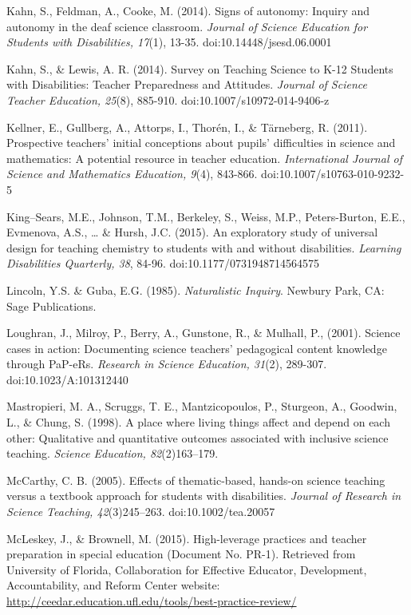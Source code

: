 \documentclass[11.5pt]{sig-alternate} %
\begin{document}
Kahn, S., Feldman, A., Cooke, M. (2014). Signs of autonomy: Inquiry and autonomy in the deaf science classroom. \textit{Journal of Science Education for Students with Disabilities, 17}(1), 13-35. doi:10.14448/jsesd.06.0001

Kahn, S., \& Lewis, A. R. (2014). Survey on Teaching Science to K-12 Students with Disabilities: Teacher Preparedness and Attitudes. \textit{Journal of Science Teacher Education, 25}(8), 885-910. doi:10.1007/s10972-014-9406-z

Kellner, E., Gullberg, A., Attorps, I., Thorén, I., \& Tärneberg, R. (2011). Prospective teachers' initial conceptions about pupils' difficulties in science and mathematics: A potential resource in teacher education. \textit{International Journal of Science and Mathematics Education, 9}(4), 843-866. doi:10.1007/s10763-010-9232-5

King–Sears, M.E., Johnson, T.M., Berkeley, S., Weiss, M.P., Peters-Burton, E.E., Evmenova, A.S., … \& Hursh, J.C. (2015). An exploratory study of universal design for teaching chemistry to students with and without disabilities. \textit{Learning Disabilities Quarterly, 38}, 84-96. doi:10.1177/0731948714564575

Lincoln, Y.S. \& Guba, E.G. (1985). \textit{Naturalistic Inquiry}. Newbury Park, CA: Sage Publications.

Loughran, J., Milroy, P., Berry, A., Gunstone, R., \& Mulhall, P., (2001). Science cases in action: Documenting science teachers’ pedagogical content knowledge through PaP-eRs. \textit{Research in Science Education, 31}(2), 289-307. doi:10.1023/A:101312440

Mastropieri, M. A., Scruggs, T. E., Mantzicopoulos, P., Sturgeon, A., Goodwin, L., \& Chung, S. (1998). A place where living things affect and depend on each other: Qualitative and quantitative outcomes associated with inclusive science teaching. \textit{Science Education, 82}(2)163–179.

McCarthy, C. B. (2005). Effects of thematic-based, hands-on science teaching versus a textbook approach for students with disabilities. \textit{Journal of Research in Science Teaching, 42}(3)245–263. doi:10.1002/tea.20057

McLeskey, J., \& Brownell, M. (2015). High-leverage practices and teacher preparation in special education (Document No. PR-1). Retrieved from University of Florida, Collaboration for Effective Educator, Development, Accountability, and Reform Center website: \url{http://ceedar.education.ufl.edu/tools/best-practice-review/}
\end{document}
